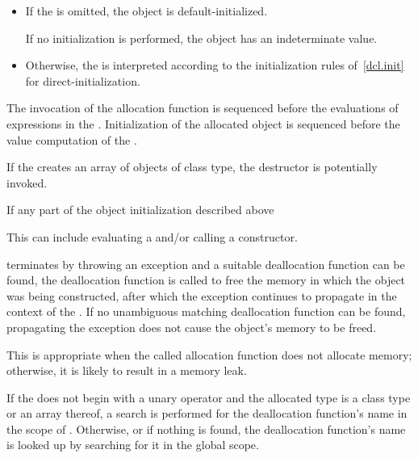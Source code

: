 \begin{itemize}
\item If the  is omitted, the object is
default-initialized.
\begin{note}
If no initialization
is performed, the object has an indeterminate value.
\end{note}

\item Otherwise, the  is interpreted according to
the initialization rules of~\ref{dcl.init} for direct-initialization.
\end{itemize}

\pnum
{}%
%
The invocation of the allocation function is sequenced before
the evaluations of expressions in the . Initialization of
the allocated object is sequenced before the
%
value computation of the
.

\pnum
If the 
creates an array of objects of class type, the destructor is potentially
invoked.

\pnum
{}%
If any part of the object initialization described above%
\begin{footnote}
This can
include evaluating a  and/or calling
a constructor.
\end{footnote}
terminates by throwing an exception and a suitable deallocation function
can be found, the deallocation function is called to free the memory in
which the object was being constructed, after which the exception
continues to propagate in the context of the .
If no unambiguous matching deallocation function can be found,
propagating the exception does not cause the object's memory to be
freed.
\begin{note}
This is appropriate when the called allocation function does not
allocate memory; otherwise, it is likely to result in a memory leak.
\end{note}

\pnum
If the  does not begin with
a unary \tcode{::} operator and
the allocated type is a class type  or an array thereof,
a search is performed for the deallocation function's name
in the scope of .
Otherwise, or if nothing is found,
the deallocation function's name is looked up by
searching for it in the global scope.

